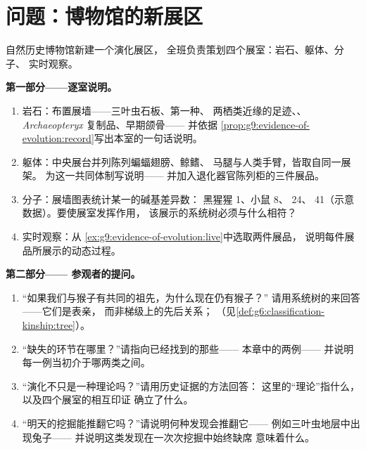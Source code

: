 \section{问题：博物馆的新展区}

\begin{problem}\label{pb:g9:evidence-of-evolution:1}
自然历史博物馆新建一个演化展区，
全班负责策划四个展室：岩石、躯体、分子、
实时观察。

\medskip\noindent\textbf{第一部分——逐室说明。}
\begin{enumerate}
  \item 岩石：布置展墙——三叶虫石板、第一种、
        两栖类近缘的足迹、、
        \emph{Archaeopteryx} 复制品、早期颌骨——
        并依据
        \cref{prop:g9:evidence-of-evolution:record}写出本室的一句话说明。
  \item 躯体：中央展台并列陈列蝙蝠翅膀、鲸鳍、
        马腿与人类手臂，皆取自同一展架。
        为这一共同体制写说明——
        并加入退化器官陈列柜的三件展品。
  \item 分子：展墙图表统计某一的碱基差异数：
        黑猩猩 1、小鼠 8、 24、
         41（示意数据）。要使展室发挥作用，
        该展示的系统树必须与什么相符？
  \item 实时观察：从
        \cref{ex:g9:evidence-of-evolution:live}中选取两件展品，
        说明每件展品所展示的动态过程。
\end{enumerate}

\medskip\noindent\textbf{第二部分——
参观者的提问。}
\begin{enumerate}[resume]
  \item “如果我们与猴子有共同的祖先，为什么现在仍有猴子？”
        请用系统树的来回答——它们是表亲，
        而非梯级上的先后关系；
        （见\cref{def:g6:classification-kinship:tree}）。
  \item “缺失的环节在哪里？”请指向已经找到的那些——
        本章中的两例——
        并说明每一例当初介于哪两类之间。
  \item “演化不只是一种理论吗？”请用历史证据的方法回答：
        这里的“理论”指什么，
        以及四个展室的相互印证
        确立了什么。
  \item “明天的挖掘能推翻它吗？”请说明何种发现会推翻它——
        例如三叶虫地层中出现兔子——
        并说明这类发现在一次次挖掘中始终缺席
        意味着什么。
\end{enumerate}


\end{problem}
